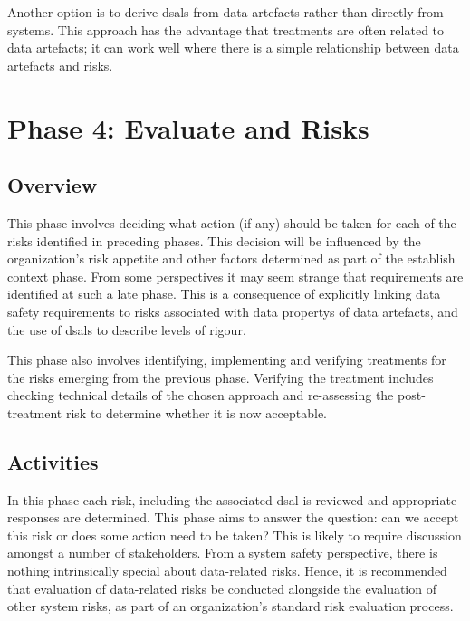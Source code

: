 Another option is to derive \glspl{dsal} from \glspl{data artefact} rather than directly \cbstart from systems\cbend. This approach has the advantage that \glspl{treatment} are often related to \glspl{data artefact}; it can work well where there is a simple relationship between \glspl{data artefact} and risks.

\section{Phase 4: Evaluate and  Risks}
\subsection{Overview}
This phase involves deciding what action (if any) should be taken for each of the risks identified in preceding phases. This decision will be influenced by the organization's risk appetite and other factors determined as part of the establish context phase. From some perspectives it may seem strange that requirements are identified at such a late phase. This is a consequence of explicitly linking data safety requirements to risks associated with \glspl{data property} of \glspl{data artefact}, and the use of \glspl{dsal} to describe levels of rigour. 

This phase also involves identifying, implementing and verifying \glspl{treatment} for the risks emerging from the previous phase. Verifying the \gls{treatment} includes checking technical details of the chosen approach and re-assessing the post-\gls{treatment} risk to determine whether it is now acceptable.

\subsection{Activities}
In this phase each risk, including the associated \gls{dsal} is reviewed and appropriate \glspl{response} are determined. This phase aims to answer the question: can we accept this risk or does some action need to be taken? This is likely to require discussion amongst a number of \glspl{stakeholder}. From a system safety perspective, there is nothing intrinsically special about data-related risks. Hence, it is recommended that evaluation of data-related risks be conducted alongside the evaluation of other system risks, as part of an organization's standard risk evaluation process.

